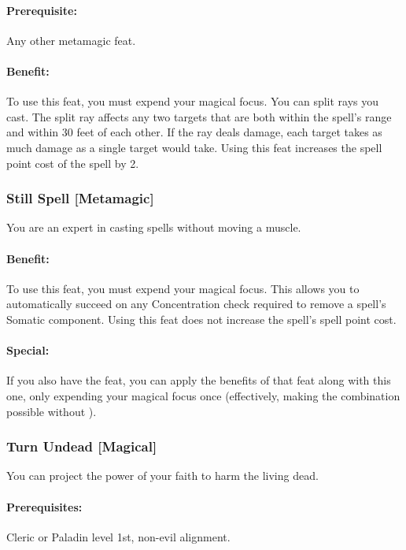 \paragraph{Prerequisite:} Any other metamagic feat.

\paragraph{Benefit:} To use this feat, you must expend your magical focus. You can split rays you cast. 
The split ray affects any two targets that are both within the spell's range and within 30 feet of each other. 
If the ray deals damage, each target takes as much damage as a single target would take.
Using this feat increases the spell point cost of the spell by 2.

\subsubsection[Still Spell]{Still Spell [Metamagic]}
\label{Feat:StillSpell}
You are an expert in casting spells without moving a muscle.

\paragraph{Benefit:} To use this feat, you must expend your magical focus.
This allows you to automatically succeed on any Concentration check required to remove a spell's Somatic component.
Using this feat does not increase the spell's spell point cost.

\paragraph{Special:} If you also have the  feat, you can apply the benefits of that feat along with this one, only expending your magical focus once 
(effectively, making the combination possible without ).
\subsubsection[Turn Undead]{Turn Undead [Magical]}
\label{Feat:TurnUndead}
You can project the power of your faith to harm the living dead.

\paragraph{Prerequisites:} Cleric or Paladin level 1st, non-evil alignment.

